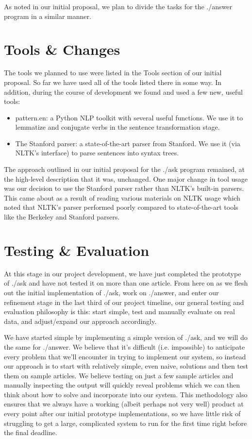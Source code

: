\documentclass{article}
\begin{document}
As noted in our initial proposal, we plan to divide the tasks for the ./answer program in a similar manner.

\section{Tools \& Changes}
The tools we planned to use were listed in the Tools section of our initial proposal. So far we have used all of the tools listed there in some way. In addition, during the course of development we found and used a few new, useful tools:
\begin{itemize}
  \item pattern.en: a Python NLP toolkit with several useful functions. We use it to lemmatize and conjugate verbs in the sentence transformation stage.
  \item The Stanford parser: a state-of-the-art parser from Stanford. We use it (via NLTK's interface) to parse sentences into syntax trees.
\end{itemize}
The approach outlined in our initial proposal for the ./ask program remained, at the high-level description that it was, unchanged. One major change in tool usage was our decision to use the Stanford parser rather than NLTK's built-in parsers. This came about as a result of reading various materials on NLTK usage which noted that NLTK's parser performed poorly compared to state-of-the-art tools like the Berkeley and Stanford parsers.

\section{Testing \& Evaluation}
At this stage in our project development, we have just completed the prototype of ./ask and have not tested it on more than one article. From here on as we flesh out the initial implementation of ./ask, work on ./answer, and enter our refinement stage in the last third of our project timeline, our general testing and evaluation philosophy is this: start simple, test and manually evaluate on real data, and adjust/expand our approach accordingly.

We have started simple by implementing a simple version of ./ask, and we will do the same for ./answer. We believe that it's difficult (i.e. impossible) to anticipate every problem that we'll encounter in trying to implement our system, so instead our approach is to start with relatively simple, even naive, solutions and then test them on sample articles. We believe testing on just a few sample articles and manually inspecting the output will quickly reveal problems which we can then think about how to solve and incorporate into our system. This methodology also ensures that we always have a working (albeit perhaps not very well) product at every point after our initial prototype implementations, so we have little risk of struggling to get a large, complicated system to run for the first time right before the final deadline.
\end{document}
